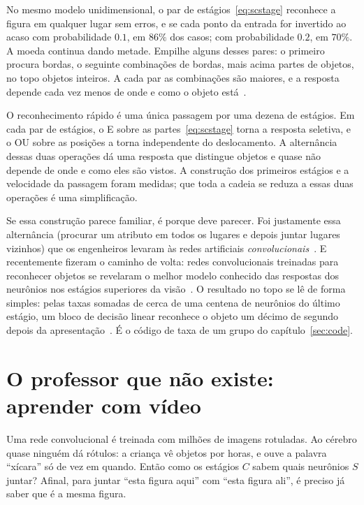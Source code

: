 No mesmo modelo unidimensional, o par de estágios~\eqref{eq:scstage} reconhece a figura em qualquer lugar sem erros, e se cada ponto da entrada for invertido ao acaso com probabilidade $0.1$, em $86\%$ dos casos; com probabilidade $0.2$, em $70\%$. A moeda continua dando metade. Empilhe alguns desses pares: o primeiro procura bordas, o seguinte combinações de bordas, mais acima partes de objetos, no topo objetos inteiros. A cada par as combinações são maiores, e a resposta depende cada vez menos de onde e como o objeto está~\cite{Riesenhuber1999}.

\begin{keyblock}
\begin{proposition}
\label{prop:conveyor}
O reconhecimento rápido é uma única passagem por uma dezena de estágios. Em cada par de estágios, o E sobre as partes~\eqref{eq:scstage} torna a resposta seletiva, e o OU sobre as posições a torna independente do deslocamento. A alternância dessas duas operações dá uma resposta que distingue objetos e quase não depende de onde e como eles são vistos. A construção dos primeiros estágios e a velocidade da passagem foram medidas; que toda a cadeia se reduza a essas duas operações é uma simplificação.
\end{proposition}
\end{keyblock}

Se essa construção parece familiar, é porque deve parecer. Foi justamente essa alternância (procurar um atributo em todos os lugares e depois juntar lugares vizinhos) que os engenheiros levaram às redes artificiais \emph{convolucionais}~\cite{Fukushima1980}. E recentemente fizeram o caminho de volta: redes convolucionais treinadas para reconhecer objetos se revelaram o melhor modelo conhecido das respostas dos neurônios nos estágios superiores da visão~\cite{Yamins2014}. O resultado no topo se lê de forma simples: pelas taxas somadas de cerca de uma centena de neurônios do último estágio, um bloco de decisão linear reconhece o objeto um décimo de segundo depois da apresentação~\cite{Hung2005}. É o código de taxa de um grupo do capítulo~\ref{sec:code}.

\section{O professor que não existe: aprender com vídeo}

Uma rede convolucional é treinada com milhões de imagens rotuladas. Ao cérebro quase ninguém dá rótulos: a criança vê objetos por horas, e ouve a palavra ``xícara'' só de vez em quando. Então como os estágios $C$ sabem quais neurônios $S$ juntar? Afinal, para juntar ``esta figura aqui'' com ``esta figura ali'', é preciso já saber que é a mesma figura.

